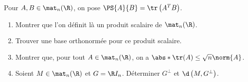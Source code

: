 \begin{enonce}
\begin{exercise}[ID={RMS133 E1295},subtitle={CCINP MP 2022},tags={},difficulty={}]
  Pour $A,B\in\mat_n(\R)$, on pose $\PS{A}{B}=\tr\left( A^T B \right)$.
  \begin{enumerate}
    \item Montrer que l'on définit là un produit scalaire de $\mat_n(\R)$.
    \item Trouver une base orthonormée pour ce produit scalaire.
    \item Montrer que, pour tout $A\in\mat_n(\R)$, on a $\abs*{\tr(A)} \leq\sqrt{n} \norm{A}$.
    \item Soient $M\in\mat_n(\R)$ et $G=\R I_n$.
      Déterminer $G^\perp$ et $\d\left( M, G^\perp \right)$.
  \end{enumerate}
\end{exercise}
\begin{solution}
\end{solution}
\end{enonce}
